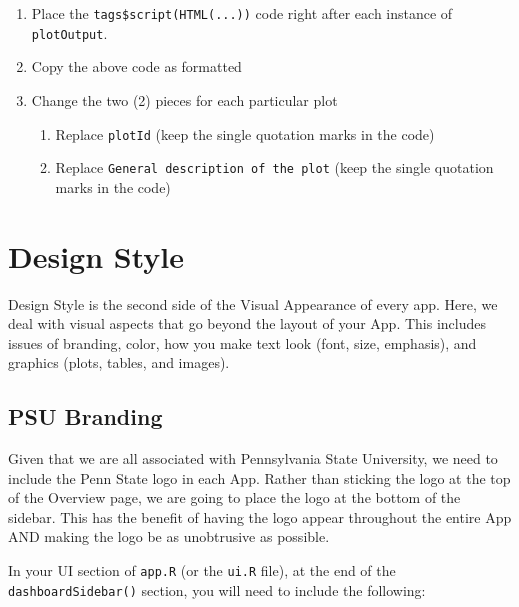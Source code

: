 \documentclass[
]{book}
\newenvironment{Shaded}{\begin{snugshade}}{\end{snugshade}}
\newcommand{\DataTypeTok}[1]{\textcolor[rgb]{0.13,0.29,0.53}{#1}}
\newcommand{\KeywordTok}[1]{\textcolor[rgb]{0.13,0.29,0.53}{\textbf{#1}}}
\newcommand{\NormalTok}[1]{#1}
\newcommand{\OperatorTok}[1]{\textcolor[rgb]{0.81,0.36,0.00}{\textbf{#1}}}
\newcommand{\StringTok}[1]{\textcolor[rgb]{0.31,0.60,0.02}{#1}}
\providecommand{\tightlist}{%
  \setlength{\itemsep}{0pt}\setlength{\parskip}{0pt}}
\begin{document}
\begin{enumerate}
\def\labelenumi{\arabic{enumi}.}
\tightlist
\item
  Place the \texttt{tags\$script(HTML(...))} code right after each instance of \texttt{plotOutput}.
\item
  Copy the above code as formatted
\item
  Change the two (2) pieces for each particular plot

  \begin{enumerate}
  \def\labelenumii{\alph{enumii}.}
  \tightlist
  \item
    Replace \texttt{plotId} (keep the single quotation marks in the code)
  \item
    Replace \texttt{General\ description\ of\ the\ plot} (keep the single quotation marks in the code)
  \end{enumerate}
\end{enumerate}

\hypertarget{designStyleb}{%
\chapter{Design Style}\label{designStyleb}}

Design Style is the second side of the Visual Appearance of every app. Here, we deal with visual aspects that go beyond the layout of your App. This includes issues of branding, color, how you make text look (font, size, emphasis), and graphics (plots, tables, and images).

\hypertarget{logob}{%
\section{PSU Branding}\label{logob}}

Given that we are all associated with Pennsylvania State University, we need to include the Penn State logo in each App. Rather than sticking the logo at the top of the Overview page, we are going to place the logo at the bottom of the sidebar. This has the benefit of having the logo appear throughout the entire App AND making the logo be as unobtrusive as possible.

In your UI section of \texttt{app.R} (or the \texttt{ui.R} file), at the end of the \texttt{dashboardSidebar()} section, you will need to include the following:

\begin{Shaded}
\end{Shaded}
\end{document}
